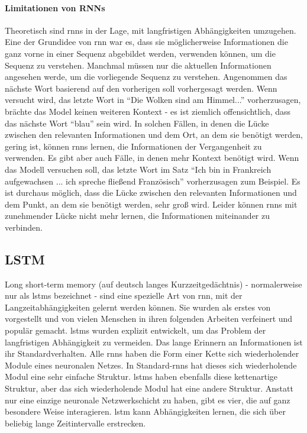 \documentclass[
        ngerman,
        paper=a4,
        numbers=noendperiod,
]{scrreprt}
\begin{document}
\paragraph{Limitationen von RNNs}
Theoretisch sind \ac{rnn}s in der Lage, mit langfristigen Abhängigkeiten umzugehen. Eine der Grundidee von \ac{rnn} war es, dass sie möglicherweise Informationen die ganz vorne in einer Sequenz abgebildet werden, verwenden können, um die Sequenz zu verstehen. Manchmal müssen nur die aktuellen Informationen angesehen werde, um die vorliegende Sequenz zu verstehen. Angenommen das nächste Wort basierend auf den vorherigen soll vorhergesagt werden. Wenn versucht wird, das letzte Wort in \enquote{Die Wolken sind am Himmel...} vorherzusagen, brächte das Model keinen weiteren Kontext - es ist ziemlich offensichtlich, dass das nächste Wort \enquote{blau} sein wird. In solchen Fällen, in denen die Lücke zwischen den relevanten Informationen und dem Ort, an dem sie benötigt werden, gering ist, können \ac{rnn}s lernen, die Informationen der Vergangenheit zu verwenden. Es gibt aber auch Fälle, in denen mehr Kontext benötigt wird. Wenn das Modell versuchen soll, das letzte Wort im Satz \enquote{Ich bin in Frankreich aufgewachsen ... ich spreche fließend Französisch} vorherzusagen zum Beispiel. Es ist durchaus möglich, dass die Lücke zwischen den relevanten Informationen und dem Punkt, an dem sie benötigt werden, sehr groß wird. Leider können \ac{rnn}s mit zunehmender Lücke nicht mehr lernen, die Informationen miteinander zu verbinden.


\subsection{LSTM}
Long short-term memory (auf deutsch langes Kurzzeitgedächtnis) - normalerweise nur als \ac{lstm}s bezeichnet - sind eine spezielle Art von \ac{rnn}, mit der Langzeitabhängigkeiten gelernt werden können. Sie wurden als erstes von \citep{Hochreiter1997LongMemory} vorgestellt und von vielen Menschen in ihren folgenden Arbeiten verfeinert und populär gemacht. \ac{lstm}s wurden explizit entwickelt, um das Problem der langfristigen Abhängigkeit zu vermeiden. Das lange Erinnern an Informationen ist ihr Standardverhalten. Alle \ac{rnn}s haben die Form einer Kette sich wiederholender Module eines neuronalen Netzes. In Standard-\ac{rnn}s hat dieses sich wiederholende Modul eine sehr einfache Struktur. \ac{lstm}s haben ebenfalls diese kettenartige Struktur, aber das sich wiederholende Modul hat eine andere Struktur. Anstatt nur eine einzige neuronale Netzwerkschicht zu haben, gibt es vier, die auf ganz besondere Weise interagieren. \ac{lstm} kann Abhängigkeiten lernen, die sich über beliebig lange Zeitintervalle erstrecken. 
\end{document}
